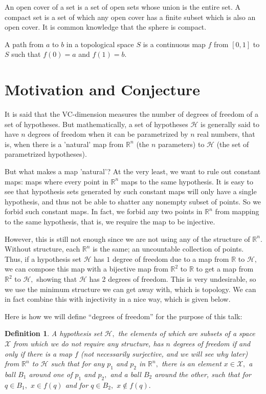 \documentclass[12pt]{amsart}
\newcommand{\0}{\mat{0}}
\newcommand{\1}{\mathds{1}}
\newtheorem{definition}[theorem]{Definition}
\begin{document}
An open cover of a set is a set of open sets whose union is the entire set. A compact set is a set of which any open cover has a finite subset which is also an open cover. It is common knowledge that the sphere is compact.

A path from $a$ to $b$ in a topological space $S$ is a continuous map $f$ from $[0, 1]$ to $S$ such that $f(0) = a$ and $f(1) = b.$

\section{Motivation and Conjecture}

It is said that the VC-dimension measures the number of degrees of freedom of a set of hypotheses. But mathematically, a set of hypotheses $\mathcal{H}$ is generally said to have $n$ degrees of freedom when it can be parametrized by $n$ real numbers, that is, when there is a 'natural' map from $\mathbb{R}^n$ (the $n$ parameters) to $\mathcal{H}$ (the set of parametrized hypotheses).

But what makes a map 'natural'? At the very least, we want to rule out constant maps: maps where every point in $\mathbb{R}^n$ maps to the same hypothesis. It is easy to see that hypothesis sets generated by such constant maps will only have a single hypothesis, and thus not be able to shatter any nonempty subset of points. So we forbid such constant maps. In fact, we forbid any two points in $\mathbb{R}^n$ from mapping to the same hypothesis, that is, we require the map to be injective.

However, this is still not enough since we are not using any of the structure of $\mathbb{R}^n.$ Without structure, each $\mathbb{R}^n$ is the same; an uncountable collection of points. Thus, if a hypothesis set $\mathcal{H}$ has $1$ degree of freedom due to a map from $\mathbb{R}$ to $\mathcal{H},$ we can compose this map with a bijective map from $\mathbb{R}^2$ to $\mathbb{R}$ to get a map from $\mathbb{R}^2$ to $\mathcal{H},$ showing that $\mathcal{H}$ has 2 degrees of freedom. This is very undesirable, so we use the minimum structure we can get away with, which is topology. We can in fact combine this with injectivity in a nice way, which is given below.

Here is how we will define ``degrees of freedom'' for the purpose of this talk:
\begin{definition}
\label{definition:absolute}
A hypothesis set $\mathcal{H},$ the elements of which are subsets of a space $\mathcal{X}$ from which we do not require any structure, has $n$ degrees of freedom if and only if there is a map $f$ (not necessarily surjective, and we will see why later) from $\mathbb{R}^n$ to $\mathcal{H}$ such that for any $p_1$ and $p_2$ in $\mathbb{R}^n,$ there is an element $x \in \mathcal{X},$ a ball $B_1$ around one of $p_1$ and $p_2,$ and a ball $B_2$ around the other, such that for $q \in B_1,$ $x \in f(q)$ and for $q \in B_2,$ $x \notin f(q).$
\end{definition}
\end{document}
